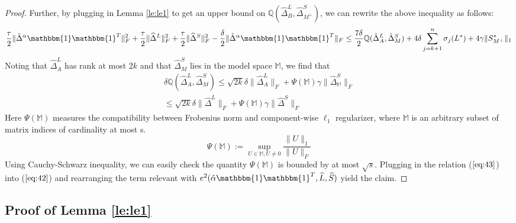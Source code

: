 \documentclass[AMS,STIX1COL]{WileyNJD-v2}
\begin{document}
\begin{proof}
Further, by plugging in Lemma \ref{le:le1} to get an upper bound on  $\mathbb{Q}(\widehat{\Delta}^L_{B},\widehat{\Delta}^S_{M^\perp})$, we can rewrite the above inequality as follows:
\begin{align}
    \frac{\tau}{2} \|\hat{\Delta}^{\alpha}\mathbbm{1}\mathbbm{1}^T\|_{F}^{2} + \frac{\tau}{2} \|\widehat{\Delta}^{L}\|_{F}^{2} + \frac{\tau}{2} \|\widehat{\Delta}^{S}\|_{F}^{2} -
    \frac{\delta}{2} \|\hat{\Delta}^{\alpha}\mathbbm{1}\mathbbm{1}^T\|_{F} 
    \leq 
    \frac{7\delta}{2}\mathbb{Q}(\hat{\Delta}^L_{A},\hat{\Delta}^S_{M}) + 4 \delta \sum_{j=k+1}^{n} \sigma_{j}(L^*) + 4\gamma \|S^*_{M^\perp}\|_{1}  \label{eq:42}
\end{align}
Noting that $\widehat{\Delta}^{L}_{A}$ has rank at most 2$k$ and that $\widehat{\Delta}^{S}_{M}$ lies in the model space $\mathbb{M}$, we find that
\begin{align}
    \nonumber 
    \delta\mathbb{Q}(\widehat{\Delta}^L_{A},\widehat{\Delta}^S_{M}) 
    \leq \sqrt{2k}\delta\|\widehat{\Delta}^L_{A}\|_{F} + \Psi(\mathbb{M})\gamma\|\widehat{\Delta}^S_\mathbb{M}\|_{F}\\
    \leq \sqrt{2k}\delta\|\widehat{\Delta}^L\|_{F} + \Psi(\mathbb{M})\gamma\|\widehat{\Delta}^S\|_{F}  \label{eq:43}
\end{align}
Here $\Psi(\mathbb{M})$ measures the compatibility between Frobenius norm and component-wise $\ell_{1}$ regularizer, where $\mathbb{M}$ is an arbitrary subset of matrix indices of cardinality at most s. 
\[
    \Psi(\mathbb{M}):=\sup\limits_{U\in\mathbb{M},U\neq0}\frac{\|U\|_{1}}{\|U\|_{F}}
\]
Using Cauchy-Schwarz inequality, we can easily check the quantity $\Psi(\mathbb{M})$ is bounded by at most $\sqrt{s}$. Plugging in the relation ($\ref{eq:43}$) into ($\ref{eq:42}$) and rearranging the term relevant with  $e^{2}(\hat{\alpha}\mathbbm{1}\mathbbm{1}^T,\widehat{L},\widehat{S})$ yield the claim.
\end{proof}


\subsection{Proof of Lemma \ref{le:le1}}
\end{document}
